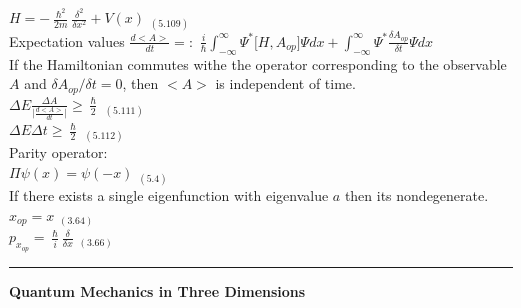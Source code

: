 \documentclass[0pt]{report}
\begin{document}
\begin{multicols*}{3}
\begin{flushleft}
$H=-\frac{\hslash^2}{2m}\frac{\delta^2}{\delta x^2}+V(x)$ $_{(5.109)}$\\
Expectation values $\frac{d\big<A\big>}{dt}=:$
$\frac{i}{\hslash}\int_{-\infty}^{\infty}\Psi^*\big[H,A_{op}\big]\Psi dx+\int_{-\infty}^{\infty}\Psi^*\frac{\delta A_{op}}{\delta t}\Psi dx$\\
If the Hamiltonian commutes withe the operator corresponding to the observable $A$ and $\delta A_{op}/\delta t=0$, then $\big<A\big>$ is independent of time.\\
$\Delta E\frac{\Delta A}{\big|\frac{d<A>}{dt}\big|}\geq\frac{\hslash}{2}$ $_{(5.111)}$\\
$\Delta E\Delta t\geq\frac{\hslash}{2}$ $_{(5.112)}$\\
Parity operator:\\
$\Pi\psi(x)=\psi(-x)$ $_{(5.4)}$\\
If there exists a single eigenfunction with eigenvalue $a$ then its nondegenerate.
$x_{op}=x$ $_{(3.64)}$\\
$p_{x_{op}}=\frac{\hslash}{i}\frac{\delta}{\delta x}$ $_{(3.66)}$\\
\noindent\rule[0.5ex]{\linewidth}{1pt}
\textbf{Quantum Mechanics in Three Dimensions}\\



\end{flushleft}
\end{multicols*}
\end{document}
